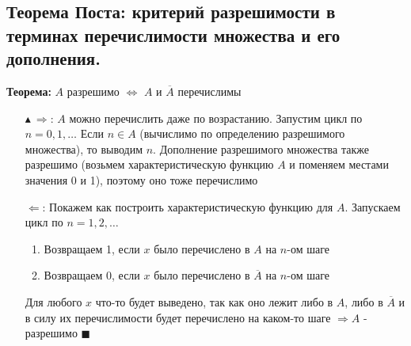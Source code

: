 \subsection{Теорема Поста: критерий разрешимости в терминах перечислимости множества и его дополнения.}
\par \textbf{Теорема:} $A$ разрешимо $\Leftrightarrow$ $A$ и $\overline{A}$ перечислимы
\par \begin{itemize}
    \item[$\blacktriangle \: \Rightarrow$:] $A$ можно перечислить даже по возрастанию. Запустим цикл по $n=0,1, \ldots$ Если $n \in A$ (вычислимо по определению разрешимого множества), то выводим $n$. Дополнение разрешимого множества также разрешимо (возьмем характеристическую функцию $A$ и поменяем местами значения 0 и 1), поэтому оно тоже перечислимо
    \item[$\Leftarrow$:] Покажем как построить характеристическую функцию для $A$. Запускаем цикл по $n=1, 2, \ldots$ \begin{enumerate}
        \item Возвращаем 1, если $x$ было перечислено в $A$ на $n$-ом шаге
        \item Возвращаем 0, если $x$ было перечислено в $\overline{A}$ на $n$-ом шаге
    \end{enumerate}
    \par Для любого $x$ что-то будет выведено, так как оно лежит либо в $A$, либо в $\overline{A}$ и в силу их перечислимости будет перечислено на каком-то шаге $\Rightarrow A$ - разрешимо $\blacksquare$
\end{itemize}

